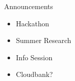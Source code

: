 \begin{frame}{Announcements}
    \begin{itemize}
        \item Hackathon
        \item Summer Research
        \item Info Session
        \item Cloudbank?
    \end{itemize}
\end{frame}
